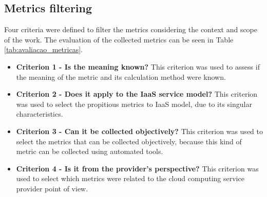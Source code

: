 \documentclass[conference]{IEEEtran}
\begin{document}
     
  \subsection{Metrics filtering}
  
	
	Four criteria were defined to filter the metrics considering the context and scope of the work.
	The evaluation of the collected metrics can be seen in Table \ref{tab:avaliacao_metricas}.
   
	\begin{itemize}
	 \item \textbf{Criterion 1 - Is the meaning known?}
	    \subitem This criterion was used to assess if the meaning of the metric and its calculation method were known.
	    
	 \item \textbf{Criterion 2 - Does it apply to the IaaS service model?}
	    \subitem This criterion was used to select the propitious metrics to IaaS model, due to its singular characteristics.
	    
	 \item \textbf{Criterion 3 - Can it be collected objectively?}
	    \subitem This criterion was used to select the metrics that can be collected objectively, because this kind of metric
	    can be collected using automated tools.
	    
	 \item \textbf{Criterion 4 - Is it from the provider's perspective?}
	    \subitem This criterion was used to select which metrics were related to the cloud computing service provider point of view.
	\end{itemize}
\end{document}
